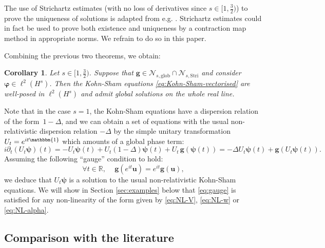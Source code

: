 \documentclass[12pt,a4paper]{amsart}
\newtheorem{corollary}[theorem]{Corollary}
\numberwithin{equation}{section}
\newcommand{\ulu}{\boldsymbol{u}}
\newcommand{\ulg}{\boldsymbol{g}}
\newcommand{\ulpsi}{\boldsymbol{\psi}}
\newcommand{\ulphi}{\boldsymbol{\varphi}}
\newcommand{\Nglob}{\mathscr{N}_{s,\mathrm{glob}}}
\newcommand{\NStri}{\mathscr{N}_{s,\mathrm{Stri}}}
\begin{document}
	
	The use of Strichartz estimates (with no loss of derivatives since $s\in[1,\frac32)$) to prove the uniqueness of solutions is adapted from e.g. \cite[Section 4.2]{cazenave2003semilinear}. Strichartz estimates could in fact be used to prove both existence and uniqueness by a contraction map method in appropriate norms. We refrain to do so in this paper.
	
	Combining the previous two theorems, we obtain:
	
	\begin{corollary}\label{cor:global_wellposedness}
		Let $s\in[1,\frac32)$. Suppose that $\ulg\in\Nglob\cap\NStri$ and consider $ \ulphi  \in \ell^2(H^{s}) $. Then the Kohn-Sham equations \eqref{eq:Kohn-Sham-vectorised} are well-posed in $\ell^2(H^s)$ and admit global solutions on the whole real line. 
	\end{corollary}
	
	Note that in the case $s=1$, the Kohn-Sham equations have a dispersion relation of the form~$ 1-\Delta $, and we can obtain a set of equations with the usual non-relativistic dispersion relation $ -\Delta $ by the simple unitary transformation $ U_t = e^{it \mathbbm{1}} $ which amounts of a global phase term:
	\begin{equation}
		i \partial_t (U_t \ulpsi)(t) = - U_t \ulpsi(t) + U_t (1- \Delta  ) \ulpsi(t) +  U_t \, \ulg(\ulpsi(t)) 
		= - \Delta U_t \ulpsi(t) + \ulg(U_t \ulpsi(t)).
	\end{equation}
	Assuming the following ``gauge'' condition to hold: 
	\begin{equation}\label{eq:gauge}
		\forall t\in \mathbb{R},\,\quad \ulg(e^{it}\ulu) = e^{it} \ulg(\ulu),
	\end{equation} 
	we deduce that $U_t \ulpsi$ is a solution to the usual non-relativistic Kohn-Sham equations. We will show in Section \ref{sec:examples} below that \eqref{eq:gauge} is satisfied for any non-linearity of the form given by \eqref{eq:NL-V}, \eqref{eq:NL-w} or \eqref{eq:NL-alpha}. 
	
	
	
	\subsection{Comparison with the literature}
	
\end{document}
